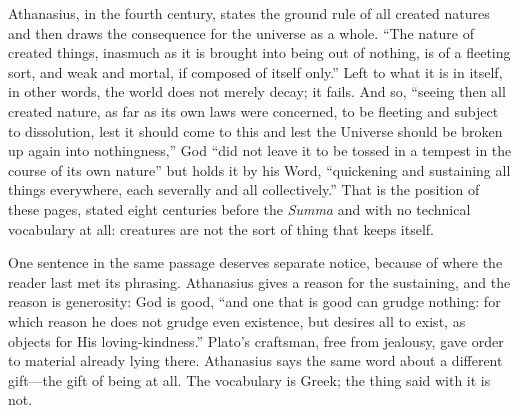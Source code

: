 Athanasius, in the fourth century, states the ground rule of all created natures and then draws the consequence for the universe as a whole. ``The nature of created things, inasmuch as it is brought into being out of nothing, is of a fleeting sort, and weak and mortal, if composed of itself only.'' Left to what it is in itself, in other words, the world does not merely decay; it fails. And so, ``seeing then all created nature, as far as its own laws were concerned, to be fleeting and subject to dissolution, lest it should come to this and lest the Universe should be broken up again into nothingness,'' God ``did not leave it to be tossed in a tempest in the course of its own nature'' but holds it by his Word, ``quickening and sustaining all things everywhere, each severally and all collectively.'' That is the position of these pages, stated eight centuries before the \emph{Summa} and with no technical vocabulary at all: creatures are not the sort of thing that keeps itself.

One sentence in the same passage deserves separate notice, because of where the reader last met its phrasing. Athanasius gives a reason for the sustaining, and the reason is generosity: God is good, ``and one that is good can grudge nothing: for which reason he does not grudge even existence, but desires all to exist, as objects for His loving-kindness.'' Plato's craftsman, free from jealousy, gave order to material already lying there. Athanasius says the same word about a different gift---the gift of being at all. The vocabulary is Greek; the thing said with it is not.

